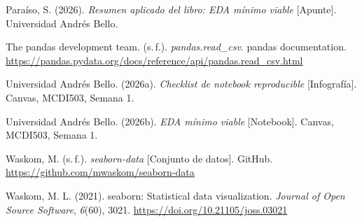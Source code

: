 \documentclass[11pt,letterpaper]{article}
\begin{document}
Paraíso, S. (2026). \textit{Resumen aplicado del libro: EDA mínimo viable} [Apunte]. Universidad Andrés Bello.

The pandas development team. (s.\,f.). \textit{pandas.read\_csv}. pandas documentation. \url{https://pandas.pydata.org/docs/reference/api/pandas.read_csv.html}

Universidad Andrés Bello. (2026a). \textit{Checklist de notebook reproducible} [Infografía]. Canvas, MCDI503, Semana 1.

Universidad Andrés Bello. (2026b). \textit{EDA mínimo viable} [Notebook]. Canvas, MCDI503, Semana 1.

Waskom, M. (s.\,f.). \textit{seaborn-data} [Conjunto de datos]. GitHub. \url{https://github.com/mwaskom/seaborn-data}

Waskom, M. L. (2021). seaborn: Statistical data visualization. \textit{Journal of Open Source Software}, \textit{6}(60), 3021. \url{https://doi.org/10.21105/joss.03021}

\endgroup
\end{document}

